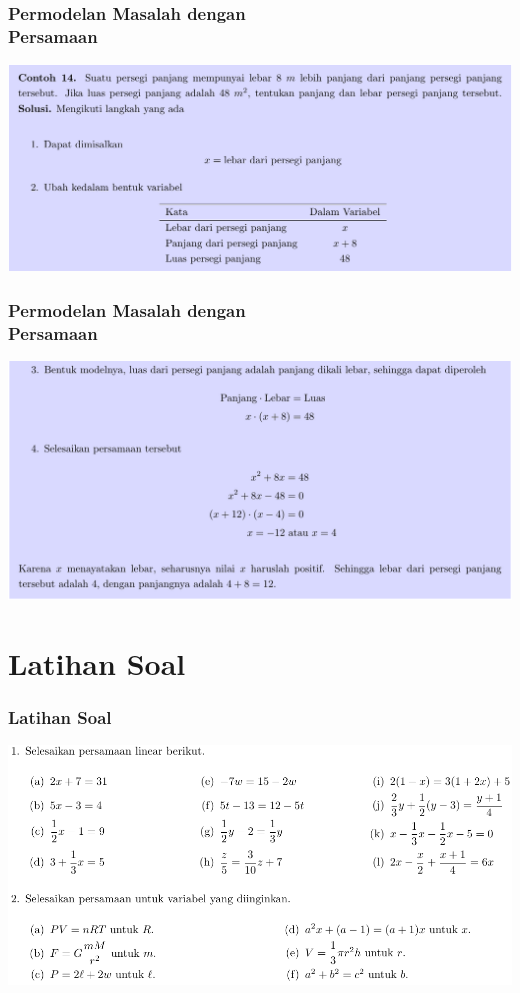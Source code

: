 \documentclass[pdflatex,compress,mathserif]{beamer}
\begin{document}
\begin{frame}
	\frametitle{Permodelan Masalah dengan\\Persamaan}
	\begin{center}
		\includegraphics[width=\linewidth]{img/img30}
	\end{center}
\end{frame}

\begin{frame}
	\frametitle{Permodelan Masalah dengan\\Persamaan}
	\begin{center}
		\includegraphics[width=\linewidth]{img/img31}
	\end{center}
\end{frame}

\section{Latihan Soal}

\begin{frame}
	\frametitle{Latihan Soal}
	\begin{center}
		\includegraphics[width=\linewidth]{img/img32}
	\end{center}
\end{frame}
\end{document}
